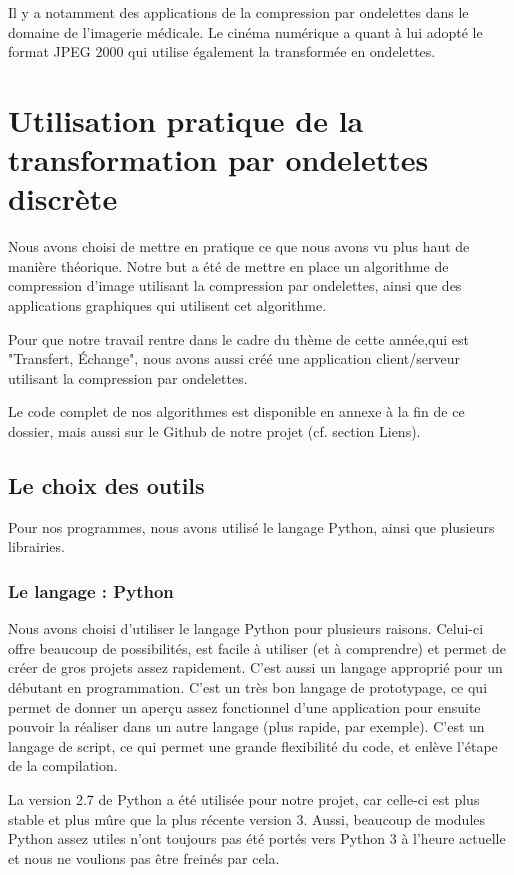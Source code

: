 \documentclass{article}
\begin{document}
Il y a notamment des applications de la compression par ondelettes dans le domaine de l’imagerie médicale. Le cinéma numérique a quant à lui adopté le format JPEG 2000 qui utilise également la transformée en ondelettes. 


\section{Utilisation pratique de la transformation par ondelettes discrète}

Nous avons choisi de mettre en pratique ce que nous avons vu plus haut
de manière théorique. Notre but a été de mettre en place un
algorithme de compression d'image utilisant la compression par
ondelettes, ainsi que des applications graphiques qui utilisent cet algorithme.

Pour que notre travail rentre dans le cadre du thème de cette année,qui est "Transfert, Échange", nous avons aussi créé une application client/serveur utilisant la compression par ondelettes.

Le code complet de nos algorithmes est disponible en annexe à la fin de ce dossier, mais aussi sur le Github de notre projet (cf. section Liens).



\subsection{Le choix des outils}

Pour nos programmes, nous avons utilisé le langage Python, ainsi que plusieurs librairies.

\subsubsection{Le langage : Python}

Nous avons choisi d'utiliser le langage Python pour plusieurs raisons. Celui-ci offre beaucoup de possibilités, est facile à utiliser (et à comprendre) et permet de créer de gros projets assez rapidement. C'est aussi un langage approprié pour un débutant en programmation. C'est un très bon langage de prototypage, ce qui permet de donner un aperçu assez fonctionnel d'une application pour ensuite pouvoir la réaliser dans un autre langage (plus rapide, par exemple). C'est un langage de script, ce qui permet une grande flexibilité du code, et enlève l'étape de la compilation.

La version 2.7 de Python a été utilisée pour notre projet, car celle-ci est plus stable et plus mûre que la plus récente version 3. Aussi, beaucoup de modules Python assez utiles n'ont toujours pas été portés vers Python 3 à l'heure actuelle et nous ne voulions pas être freinés par cela. 
\end{document}
